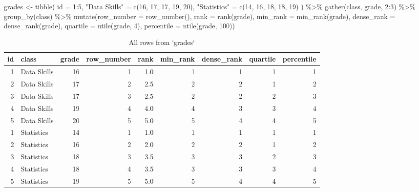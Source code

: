 \documentclass[
  oneside]{book}
\newenvironment{Shaded}{\begin{snugshade}}{\end{snugshade}}
\newcommand{\AttributeTok}[1]{\textcolor[rgb]{0.77,0.63,0.00}{#1}}
\newcommand{\DecValTok}[1]{\textcolor[rgb]{0.00,0.00,0.81}{#1}}
\newcommand{\FunctionTok}[1]{\textcolor[rgb]{0.00,0.00,0.00}{#1}}
\newcommand{\NormalTok}[1]{#1}
\newcommand{\OtherTok}[1]{\textcolor[rgb]{0.56,0.35,0.01}{#1}}
\newcommand{\SpecialCharTok}[1]{\textcolor[rgb]{0.00,0.00,0.00}{#1}}
\newcommand{\StringTok}[1]{\textcolor[rgb]{0.31,0.60,0.02}{#1}}
\begin{document}
\begin{Shaded}
\begin{Highlighting}[]
\NormalTok{grades }\OtherTok{\textless{}{-}} \FunctionTok{tibble}\NormalTok{(}
  \AttributeTok{id =} \DecValTok{1}\SpecialCharTok{:}\DecValTok{5}\NormalTok{,}
  \StringTok{"Data Skills"} \OtherTok{=} \FunctionTok{c}\NormalTok{(}\DecValTok{16}\NormalTok{, }\DecValTok{17}\NormalTok{, }\DecValTok{17}\NormalTok{, }\DecValTok{19}\NormalTok{, }\DecValTok{20}\NormalTok{), }
  \StringTok{"Statistics"}  \OtherTok{=} \FunctionTok{c}\NormalTok{(}\DecValTok{14}\NormalTok{, }\DecValTok{16}\NormalTok{, }\DecValTok{18}\NormalTok{, }\DecValTok{18}\NormalTok{, }\DecValTok{19}\NormalTok{)}
\NormalTok{) }\SpecialCharTok{\%\textgreater{}\%}
  \FunctionTok{gather}\NormalTok{(class, grade, }\DecValTok{2}\SpecialCharTok{:}\DecValTok{3}\NormalTok{) }\SpecialCharTok{\%\textgreater{}\%}
  \FunctionTok{group\_by}\NormalTok{(class) }\SpecialCharTok{\%\textgreater{}\%}
  \FunctionTok{mutate}\NormalTok{(}\AttributeTok{row\_number =} \FunctionTok{row\_number}\NormalTok{(),}
         \AttributeTok{rank       =} \FunctionTok{rank}\NormalTok{(grade),}
         \AttributeTok{min\_rank   =} \FunctionTok{min\_rank}\NormalTok{(grade),}
         \AttributeTok{dense\_rank =} \FunctionTok{dense\_rank}\NormalTok{(grade),}
         \AttributeTok{quartile   =} \FunctionTok{ntile}\NormalTok{(grade, }\DecValTok{4}\NormalTok{),}
         \AttributeTok{percentile =} \FunctionTok{ntile}\NormalTok{(grade, }\DecValTok{100}\NormalTok{))}
\end{Highlighting}
\end{Shaded}

\begin{table}

\caption{\label{tab:unnamed-chunk-1}All rows from `grades`}
\centering
\begin{tabular}[t]{r|l|r|r|r|r|r|r|r}
\hline
id & class & grade & row\_number & rank & min\_rank & dense\_rank & quartile & percentile\\
\hline
1 & Data Skills & 16 & 1 & 1.0 & 1 & 1 & 1 & 1\\
\hline
2 & Data Skills & 17 & 2 & 2.5 & 2 & 2 & 1 & 2\\
\hline
3 & Data Skills & 17 & 3 & 2.5 & 2 & 2 & 2 & 3\\
\hline
4 & Data Skills & 19 & 4 & 4.0 & 4 & 3 & 3 & 4\\
\hline
5 & Data Skills & 20 & 5 & 5.0 & 5 & 4 & 4 & 5\\
\hline
1 & Statistics & 14 & 1 & 1.0 & 1 & 1 & 1 & 1\\
\hline
2 & Statistics & 16 & 2 & 2.0 & 2 & 2 & 1 & 2\\
\hline
3 & Statistics & 18 & 3 & 3.5 & 3 & 3 & 2 & 3\\
\hline
4 & Statistics & 18 & 4 & 3.5 & 3 & 3 & 3 & 4\\
\hline
5 & Statistics & 19 & 5 & 5.0 & 5 & 4 & 4 & 5\\
\hline
\end{tabular}
\end{table}
\end{document}
